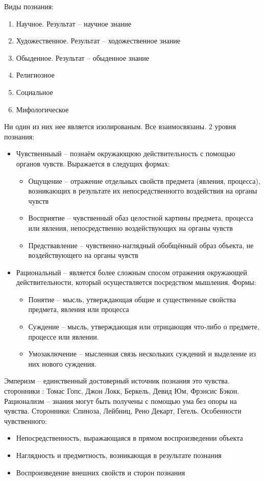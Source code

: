 \documentclass[12pt,a4paper]{book}
\begin{document}
Виды познания:
\begin{enumerate}
	\item Научное. Результат -- научное знание
	\item Художественное. Результат -- ходожественное знание
	\item Обыденное. Результат -- обыденное знание
	\item Религиозное
	\item Социальное
	\item Мифологическое
\end{enumerate}
Ни один из них нее является изолированым. Все взаимосвязаны.
2 уровня познания:
\begin{itemize}
	\item Чувственныый -- познаём окружающюю действительность с помощью органов чувств. Выражается в следущих формах:
	\begin{itemize}
		\item Ощущение -- отражение отдельных свойств предмета (явления, процесса), возникающих в результате их непосредственногго воздействия на органы чувств
		\item Восприятие -- чувственный обаз целостной картины предмета, процесса или явления, непосредственно воздействующих на органы чувств
		\item Предствавление -- чувственно-наглядный обобщённый образ объекта, не воздействующего на органы чувств
	\end{itemize}
	\item Рациональный -- является более сложным спосом отражения окружающей действительности, который осуществляется посредством мышления. Формы:
	\begin{itemize}
		\item Понятие -- мысль, утверждающая общие и существенные свойства предмета, явления или процесса
		\item Суждение -- мысль, утверждающая или отрицающяя что-либо о предмете, процессе или явлении.
		\item Умозаключение -- мысленная связь нескольких суждений и выделение из них нового суждения.
	\end{itemize}
\end{itemize}
Эмперизм -- единственный достоверный источник познания это чувства. сторонники : Томас Гопс, Джон Локк, Беркель, Девид Юм, Фрэнсис Бэкон.\\
Рационализм -- знания могут быть получены с помощью ума без опоры на чувства. Сторонники: Спиноза, Лейбниц, Рено Декарт, Гегель.
Особенности чувственного:
\begin{itemize}
	\item Непосредственность, выражающаяся в прямом воспроизведении объекта
	\item Наглядность и предметность, возникающая в результате познания
	\item Воспроизведение внешних свойств и сторон познания
\end{itemize}
\end{document}
